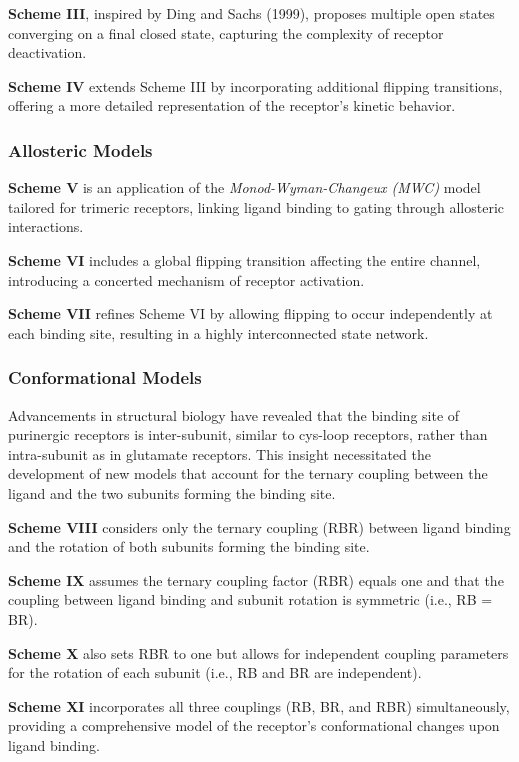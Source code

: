\documentclass[pdflatex,sn-mathphys-num]{sn-jnl}%
\theoremstyle{thmstyleone}%
\theoremstyle{thmstyletwo}%
\theoremstyle{thmstylethree}%
\begin{document}
\textbf{Scheme III}, inspired by Ding and Sachs (1999), proposes multiple open states converging on a final closed state, capturing the complexity of receptor deactivation.

\textbf{Scheme IV} extends Scheme III by incorporating additional flipping transitions, offering a more detailed representation of the receptor's kinetic behavior.

\subsubsection{Allosteric Models}

\textbf{Scheme V} is an application of the \textit{Monod-Wyman-Changeux (MWC)} model tailored for trimeric receptors, linking ligand binding to gating through allosteric interactions.

\textbf{Scheme VI} includes a global flipping transition affecting the entire channel, introducing a concerted mechanism of receptor activation.

\textbf{Scheme VII} refines Scheme VI by allowing flipping to occur independently at each binding site, resulting in a highly interconnected state network.

\subsubsection{Conformational Models}

Advancements in structural biology have revealed that the binding site of purinergic receptors is inter-subunit, similar to cys-loop receptors, rather than intra-subunit as in glutamate receptors. This insight necessitated the development of new models that account for the ternary coupling between the ligand and the two subunits forming the binding site.

\textbf{Scheme VIII} considers only the ternary coupling (RBR) between ligand binding and the rotation of both subunits forming the binding site.

\textbf{Scheme IX} assumes the ternary coupling factor (RBR) equals one and that the coupling between ligand binding and subunit rotation is symmetric (i.e., RB = BR).

\textbf{Scheme X} also sets RBR to one but allows for independent coupling parameters for the rotation of each subunit (i.e., RB and BR are independent).

\textbf{Scheme XI} incorporates all three couplings (RB, BR, and RBR) simultaneously, providing a comprehensive model of the receptor's conformational changes upon ligand binding.
\end{document}
